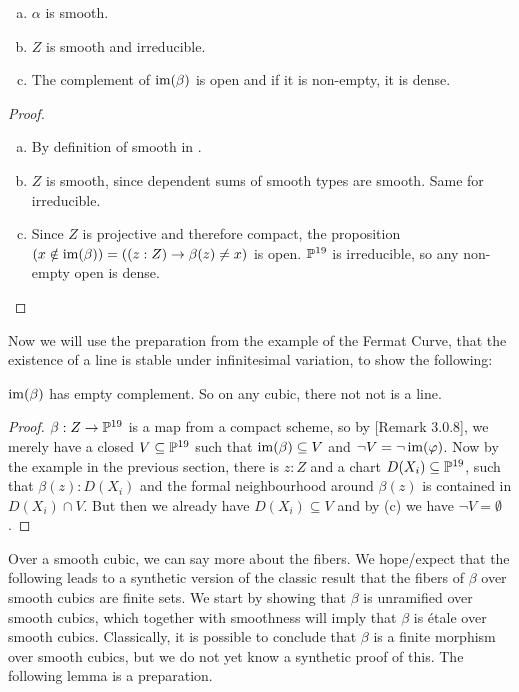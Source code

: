 \begin{corollary}
  \label{topological-properties-lines-on-cubics}
\begin{center}
\begin{enumerate}[(a)]
\item \(\alpha\) is smooth.
\item \(Z\) is smooth and irreducible.
\item The complement of \(\operatorname{im}(\beta)\) is open and if it is non-empty, it is dense.
\end{enumerate}
\end{center}
\end{corollary}

\begin{proof}
\begin{enumerate}[(a)]
\item By definition of smooth in \cite{diffgeo-article}.
\item \(Z\) is smooth, since dependent sums of smooth types are smooth. Same for irreducible.
\item Since \(Z\) is projective and therefore compact, the proposition \((x\notin \operatorname{im}(\beta))=((z:Z)\to \beta(z)\neq x)\) is open. \(\mathbb{P}^{19}\) is irreducible,
so any non-empty open is dense.
\end{enumerate}
\end{proof}

Now we will use the preparation from the example of the Fermat Curve, that the existence of a line is stable under infinitesimal variation, to show the following:

\begin{lemma}
  \(\operatorname{im}(\beta)\) has empty complement. So on any cubic, there not not is a line.
\end{lemma}

\begin{proof}
  \(\beta:Z\to \mathbb{P}^{19}\) is a map from a compact scheme, so by \cite{proper-draft}[Remark 3.0.8],
  we merely have a closed \(V\subseteq \mathbb{P}^{19}\) such that \(\operatorname{im}(\beta)\subseteq V\) and \(\neg V=\neg \operatorname{im}(\varphi)\).
  Now by the example in the previous section, there is \(z:Z\) and a chart \(D(X_i)\subseteq \mathbb{P}^{19}\),
  such that \(\beta(z):D(X_i)\) and the formal neighbourhood around \(\beta(z)\) is contained in
  \(D(X_i)\cap V\). But then we already have \(D(X_i)\subseteq V\) and by  (c) we have \(\neg V=\emptyset\).
\end{proof}

Over a smooth cubic, we can say more about the fibers.
We hope/expect that the following leads to a synthetic version of the classic result that the fibers of \(\beta\) over smooth cubics are finite sets.
We start by showing that \(\beta\) is unramified over smooth cubics, which together with smoothness will imply that \(\beta\) is étale over smooth cubics. Classically, it is possible to conclude that \(\beta\) is a finite morphism over smooth cubics, but we do not yet know a synthetic proof of this.
The following lemma is a preparation.

